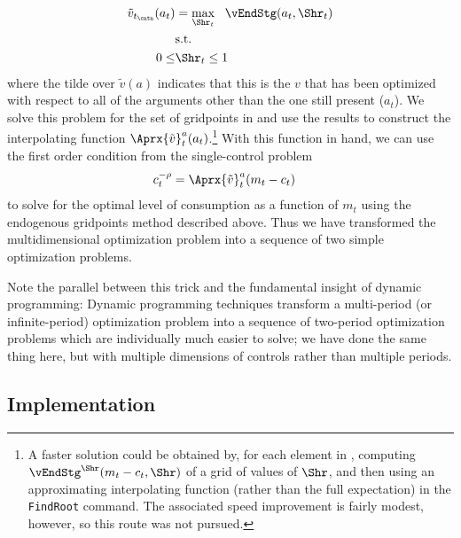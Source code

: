 \documentclass[titlepage, headings=optiontotocandhead]{econtex}
\begin{document}
\begin{equation}\begin{gathered}\begin{aligned}
      \tilde{v}_{{t_\cntn}}(a_{t})  & = \max_{\Shr_{t}} ~~  \vEndStg(a_{t},\Shr_{t})
      \\      & \text{s.t.} \nonumber
      \\      0 \leq & \Shr_{t} \leq 1
    \end{aligned}\end{gathered}\end{equation}
where the tilde over $\tilde{v}(a)$ indicates that this is the $v$ that has been optimized with respect to all of the arguments other than the one still present ($a_{t}$).  We solve this problem for the set of gridpoints in  and use the results to construct the interpolating function $\Aprx{\tilde{v}}_{t}^{a}(a_{t})$.\footnote{A faster solution could be obtained by, for each element in , computing $\vEndStg^{\Shr}(m_{t}-c_{t},\Shr)$ of a grid of values of $\Shr$, and then using an approximating interpolating function (rather than the full expectation) in the \texttt{FindRoot} command.  The associated speed improvement is fairly modest, however, so this route was not pursued.}  With this function in hand, we can use the first order condition from the single-control problem
\begin{equation*}\begin{gathered}\begin{aligned}
      c_{t}^{-\rho}  & = \Aprx{\tilde{v}}_{t}^{a}(m_{t}-c_{t})
    \end{aligned}\end{gathered}\end{equation*}
to solve for the optimal level of consumption as a function of $m_{t}$ using the endogenous gridpoints method described above.  Thus we have transformed the multidimensional optimization problem into a sequence of two simple optimization problems.

Note the parallel between this trick and the fundamental insight of dynamic programming: Dynamic programming techniques transform a multi-period (or infinite-period) optimization problem into a sequence of two-period optimization problems which are individually much easier to solve; we have done the same thing here, but with multiple dimensions of controls rather than multiple periods.

\hypertarget{implementation}{}
\subsection{Implementation}
\end{document}
